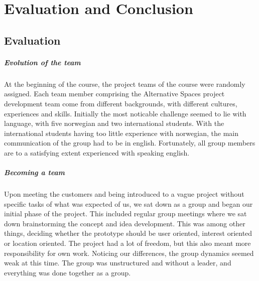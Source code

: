 \chapter{Evaluation and Conclusion}
\label{chap:Eval}

\section{Evaluation} 
\paragraph{Evolution of the team} At the beginning of the course, the project teams of the course were randomly assigned. Each team member comprising the Alternative Spaces project development team come from different backgrounds, with different cultures, experiences and skills. Initially the most noticable challenge seemed to lie with language, with five norwegian and two international students. With the international students having too little experience with norwegian, the main communication of the group had to be in english. Fortunately, all group members are to a satisfying extent experienced with speaking english. 
\paragraph{Becoming a team} Upon meeting the customers and being introduced to a vague project without specific tasks of what was expected of us, we sat down as a group and began our initial phase of the project. This included regular group meetings where we sat down brainstorming the concept and idea development. This was among other things, deciding whether the prototype should be user oriented, interest oriented or location oriented. The project had a lot of freedom, but this also meant more responsibility for own work. Noticing our differences, the group dynamics seemed weak at this time. The group was unstructured and without a leader, and everything was done together as a group. 
